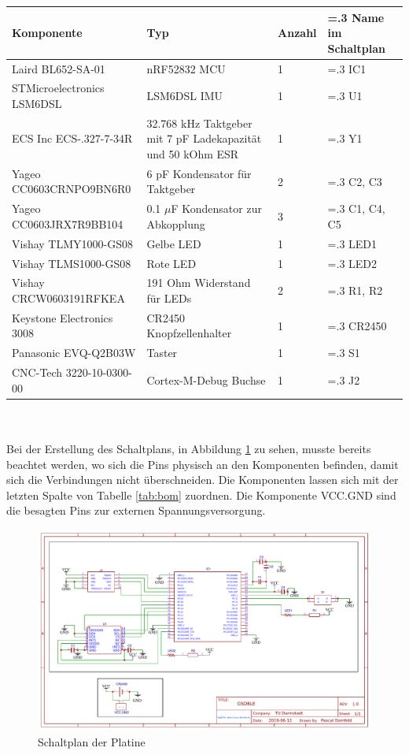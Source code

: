 \begin{minipage}{\linewidth}
	\label{tab:bom}
	\begin{tabularx}{\linewidth}{l|X|l|>{\hsize=.3\hsize}X}
		Komponente & Typ & Anzahl & Name im Schaltplan\\
		\hline
		Laird BL652-SA-01 & nRF52832 MCU & 1 & IC1\\
		STMicroelectronics LSM6DSL & LSM6DSL IMU & 1 & U1\\
		ECS Inc ECS-.327-7-34R & 32.768 kHz Taktgeber mit 7 pF Ladekapazität und 50 kOhm ESR & 1 & Y1\\
		Yageo CC0603CRNPO9BN6R0 & 6 pF Kondensator für Taktgeber & 2 & C2, C3\\
		Yageo CC0603JRX7R9BB104 & 0.1 $\mu$F Kondensator zur Abkopplung & 3 & C1, C4, C5\\
		Vishay TLMY1000-GS08 & Gelbe LED & 1 & LED1\\
		Vishay TLMS1000-GS08 & Rote LED & 1 & LED2\\
		Vishay CRCW0603191RFKEA & 191 Ohm Widerstand für LEDs & 2 & R1, R2\\
		Keystone Electronics 3008 & CR2450 Knopfzellenhalter & 1 & CR2450\\
		Panasonic EVQ-Q2B03W & Taster & 1 & S1\\
		CNC-Tech 3220-10-0300-00 & Cortex-M-Debug Buchse & 1 & J2\\
  \end{tabularx}
\end{minipage}\\\\
Bei der Erstellung des Schaltplans, in Abbildung \ref{fig:schematic} zu sehen, musste bereits beachtet werden, wo sich die Pins physisch an den Komponenten befinden, damit sich die Verbindungen nicht überschneiden.
Die Komponenten lassen sich mit der letzten Spalte von Tabelle \ref{tab:bom} zuordnen.
Die Komponente VCC.GND sind die besagten Pins zur externen Spannungsversorgung.
\begin{figure}[p]
	\centering
	\includegraphics[height=0.8\linewidth,angle=90]{res/schematic.pdf}
	\caption{Schaltplan der Platine}
	\label{fig:schematic}
\end{figure}\\
